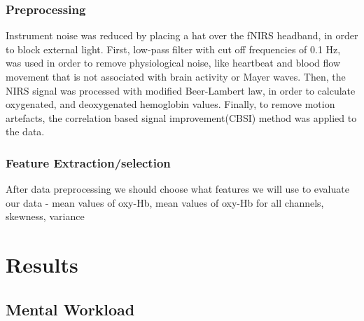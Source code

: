 \documentclass[a4paper]{report}
\begin{document}
			\subsubsection{Preprocessing}
			Instrument noise was reduced by placing a hat over the fNIRS headband, in order to block external light.
			First, low-pass filter with cut off frequencies of 0.1 Hz, was used in order to remove physiological noise, like heartbeat and blood flow movement that is not associated with brain activity or Mayer waves.
			Then, the NIRS signal was processed with modified Beer-Lambert law\cite{cope1988system}, in order to calculate oxygenated, and deoxygenated hemoglobin values.
			Finally, to remove motion artefacts, the correlation based signal improvement(CBSI)\cite{cui2010functional} method was applied to the data.
			\subsubsection{Feature Extraction/selection}
			After data preprocessing we should choose what features we will use to evaluate our data - mean values of oxy-Hb, mean values of oxy-Hb for all channels, skewness, variance
	\section{Results}
		\subsection{Mental Workload}
\end{document}
